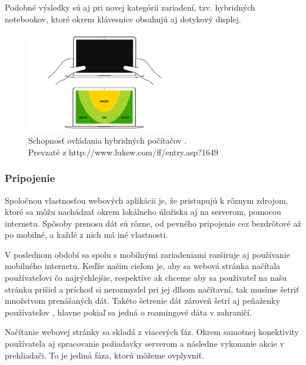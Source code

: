Podobné výsledky \cite{mobilebooktouch} sú aj pri novej kategórii zariadení, tzv. hybridných notebookov, ktoré okrem klávesnice obsahujú aj dotykový displej.

\begin{figure}[H]
	\centering
	\includegraphics[width=0.6\textwidth]{img/tnav-touch-laptops.png}
	\caption[Schopnosť ovládania hybridných počítačov]{
		Schopnosť ovládania hybridných počítačov \cite{navigation}.\\
		Prevzaté z http://www.lukew.com/ff/entry.asp?1649}
	\label{fig: tnavlaptops}
\end{figure}




\subsubsection{Pripojenie} %
\label{ssub:pripojenie}

Spoločnou vlastnosťou webových aplikácii je, že pristupujú k rôznym zdrojom, ktoré sa môžu nachádzať okrem lokálneho úložiska aj na serverom, pomocou internetu. Spôsoby prenosu dát sú rôzne, od pevného pripojenie cez bezdrôtové až po mobilné, a každé z nich má iné vlastnosti.

V poslednom období sa spolu s mobilnými zariadeniami rozširuje aj používanie mobilného internetu. Keďže našim cieľom je, aby sa webová stránka načítala používateľovi čo najrýchlejšie, respektíve ak chceme aby sa používateľ na našu stránku prišiel a príchod si nerozmyslel pri jej dlhom načítavní, tak musíme šetriť množstvom prenášaných dát. Takéto šetrenie dát zároveň šetrí aj peňaženky používateľov \cite{performance}, hlavne pokiaľ sa jedná o roamingové dáta v zahraničí.

Načítanie webovej stránky sa skladá z viacerých fáz. Okrem samotnej konektivity používateľa aj spracovanie požiadavky serverom a následne vykonanie akcie v prehliadači. To je jediná fáza, ktorú môžeme ovplyvniť.

